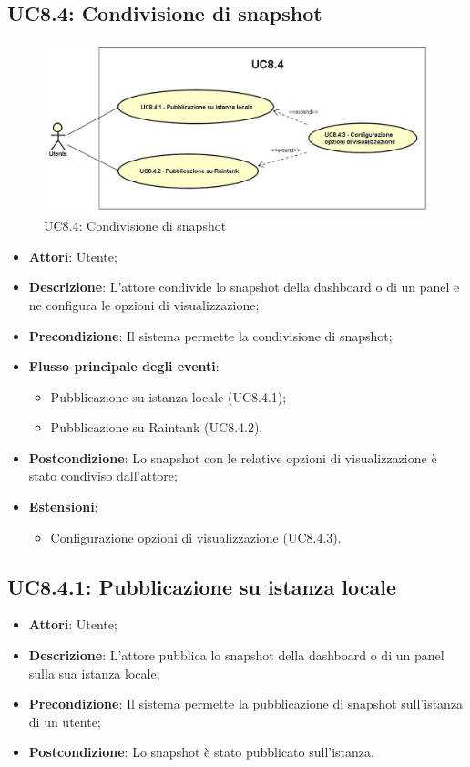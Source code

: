 \subsection{UC8.4: Condivisione di snapshot}
\hypertarget{UC8.4}{}
\begin{figure} [H]
	\centering
	\includegraphics[scale=0.45]{Img/UC8-4}
	\caption{UC8.4: Condivisione di snapshot}\label{}
\end{figure}
\begin{itemize}
	\item \textbf{Attori}: Utente;
	\item \textbf{Descrizione}: L'attore condivide lo snapshot della dashboard o di un panel e ne configura le opzioni di visualizzazione;
	\item \textbf{Precondizione}: Il sistema permette la condivisione di snapshot;
	\item \textbf{Flusso principale degli eventi}:
	\begin{itemize}
		\item Pubblicazione su istanza locale (UC8.4.1);
		\item Pubblicazione su Raintank (UC8.4.2).
	\end{itemize}
	\item \textbf{Postcondizione}: Lo snapshot con le relative opzioni di visualizzazione è stato condiviso dall'attore;
	\item \textbf{Estensioni}:
	\begin{itemize}
		\item Configurazione opzioni di visualizzazione (UC8.4.3).
	\end{itemize}
\end{itemize}

\subsection{UC8.4.1: Pubblicazione su istanza locale}
\hypertarget{UC8.4.1}{}
\begin{itemize}
	\item \textbf{Attori}: Utente;
	\item \textbf{Descrizione}: L'attore pubblica lo snapshot della dashboard o di un panel sulla sua istanza locale;
	\item \textbf{Precondizione}: Il sistema permette la pubblicazione di snapshot sull'istanza di un utente;
	\item \textbf{Postcondizione}: Lo snapshot è stato pubblicato sull'istanza.
\end{itemize}

